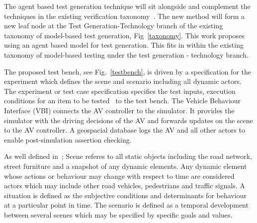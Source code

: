 \documentclass[letterpaper, 10 pt, journal, twoside]{IEEEtran}
\begin{document}
The agent based test generation technique will sit alongside and complement the techniques in the existing verification taxonomy~\cite{utting2012taxonomy}. The new method will form a new leaf node at the Test Generation-Technology branch of the existing taxonomy of model-based test generation, Fig~\ref{taxonomy}. %
%
This work proposes using an agent based model for test generation. This fits in within the existing taxonomy of model-based testing \cite{utting2012taxonomy} under the test generation - technology branch.



The proposed test bench, see Fig.~\ref{testbench}, is driven by a specification for the experiment which defines the scene and scenario including all dynamic actors. 
%
The experiment or test case specification specifies the test inputs, execution conditions for an item to be tested~\cite{StandardsBoard1990} to the test bench. 
%
The Vehicle Behaviour Interface (VBI) connects the AV controller to the simulator. It provides the simulator with the driving decisions of the AV and forwards updates on the scene to the AV controller. 
%
A geospacial database logs the AV and all other actors to enable post-simulation assertion checking. %

As well defined in~\cite{Ulbrich2015}; Scene referes to all static objects including the road network, street furniture and a snapshot of any dynamic elements. Any dynamic element whose actions or behaviour may change with respect to time are considered actors which may include other road vehicles, pedestrians and traffic signals. 
%
A situation is defined as the subjective conditions and determinants for behaviour at a particular point in time. 
%
The scenario is defined as a temporal development between several scenes which may be specified by specific goals and values.
\end{document}
